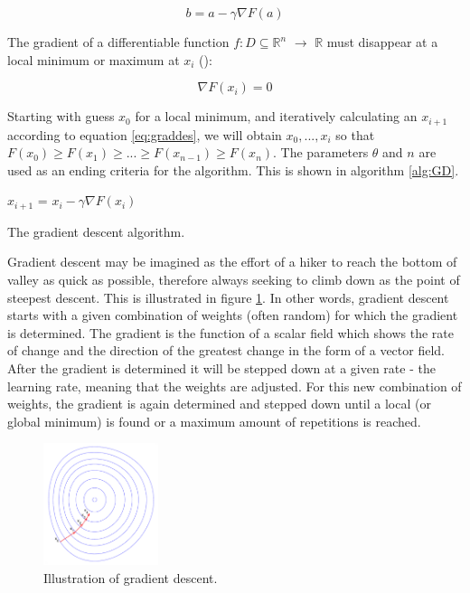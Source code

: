 \documentclass[10pt,a4paper,DIV=11]{scrreprt}
\begin{document}
\begin{equation}
 b = a - \gamma \nabla F(a)
\label{eq:graddes}
\end{equation} 

The gradient of a differentiable function $f: D \subseteq \mathds{R}^n$ $\rightarrow$ $\mathds{R}$ must disappear at a local minimum or maximum 
at $x_i$ (\cite{MATHINF}):

\begin{equation}
\nabla F(x_i) = 0
\end{equation} 

Starting with guess $x_0$ for a local minimum, and iteratively calculating an $x_{i+1}$ according to equation \eqref{eq:graddes}, we will obtain 
$x_0, ..., x_i$ so that $F(x_0) \geq F(x_1) \geq ... \geq F(x_{n-1}) \geq F(x_n)$. The parameters $\theta$ and $n$ are used as an ending 
criteria for the algorithm. This is shown in algorithm \ref{alg:GD}.

\begin{algorithm}
\LinesNumbered
\DontPrintSemicolon
\BlankLine
{}
\BlankLine
\Begin
{
    {
        $x_{i+1}$ = $x_i - \gamma \nabla F(x_i)$
    }
}
\caption{The gradient descent algorithm.}
\label{alg:GD}
\end{algorithm}

Gradient descent may be imagined as the effort of a hiker to reach the bottom of valley as quick as possible, therefore always seeking 
to climb down as the point of steepest descent. This is illustrated in figure \ref{fig:grad}.
In other words, gradient descent starts with a given combination of weights (often random) for which the gradient is determined. The gradient is 
the function of a scalar field which shows the rate of change and the direction of the greatest change in the form of a vector field. After the 
gradient is determined it will be stepped down at a given rate - the learning rate, meaning that the weights are adjusted. For this new combination 
of weights, the gradient is again determined and stepped down until a local (or global minimum) is found or a maximum amount of repetitions is 
reached.

\begin{figure}[H]

    \centering
    \includegraphics[width=0.3\textwidth,scale=1]{files/graddes.png}  
    \caption{Illustration of gradient descent.\cite{GRADFIG}}
    \label{fig:grad}
\end{figure}
\end{document}
